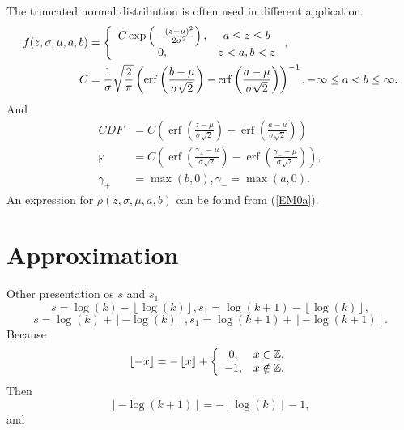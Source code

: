 \documentclass[titlepage,fleqn]{article}%
\providecommand{\U}[1]{\protect\rule{.1in}{.1in}}
\begin{document}
The truncated normal distribution is often used in different application.
\begin{align*}
f(z,\sigma,\mu,a,b)  &  =\left\{
\begin{array}
[c]{cc}%
C\exp\left(  -\frac{(z-\mu)^{2}}{2\sigma^{2}}\right)  , & a\leq z\leq b\\
0, & z<a,b<z
\end{array}
\right.  ,\\
C  &  =\frac{1}{\sigma}\sqrt{\frac{2}{\pi}}\left(  \operatorname{erf}\left(
\frac{b-\mu}{\sigma\sqrt{2}}\right)  -\operatorname{erf}\left(  \frac{a-\mu
}{\sigma\sqrt{2}}\right)  \right)  ^{-1},-\infty\leq a<b\leq\infty.
\end{align*}
And%
\begin{align*}
CDF  &  =C\left(  \operatorname{erf}\left(  \frac{z-\mu}{\sigma\sqrt{2}%
}\right)  -\operatorname{erf}\left(  \frac{a-\mu}{\sigma\sqrt{2}}\right)
\right) \\
\digamma &  =C\left(  \operatorname{erf}\left(  \frac{\gamma_{+}-\mu}%
{\sigma\sqrt{2}}\right)  -\operatorname{erf}\left(  \frac{\gamma_{-}-\mu
}{\sigma\sqrt{2}}\right)  \right)  ,\\
\gamma_{+}  &  =\max(b,0),\gamma_{-}=\max(a,0).
\end{align*}
An expression for $\rho(z,\sigma,\mu,a,b)$ can be found from (\ref{EM0a}).

\section{Approximation}%

\label{Approximation}%


\bigskip Other presentation os $s$ and $s_{1}$%
\[
s=\log(k)-\left\lfloor \log\left(  k\right)  \right\rfloor ,s_{1}%
=\log(k+1)-\left\lfloor \log\left(  k\right)  \right\rfloor ,
\]%
\[
s=\log(k)+\left\lfloor -\log\left(  k\right)  \right\rfloor ,s_{1}%
=\log(k+1)+\left\lfloor -\log\left(  k+1\right)  \right\rfloor .
\]
Because%
\[
\left\lfloor -x\right\rfloor =-\left\lfloor x\right\rfloor +\left\{
\begin{array}
[c]{cc}%
0, & x\in%
\mathbb{Z}
,\\
-1, & x\notin%
\mathbb{Z}
,
\end{array}
\right.
\]
Then%
\[
\left\lfloor -\log\left(  k+1\right)  \right\rfloor =-\left\lfloor \log\left(
k\right)  \right\rfloor -1,
\]
and%
\end{document}
